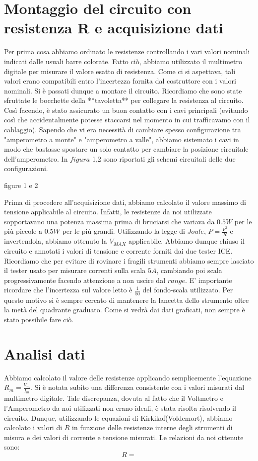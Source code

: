 \section{Montaggio del circuito con resistenza R e acquisizione dati}
Per prima cosa abbiamo ordinato le resistenze controllando i vari valori nominali indicati dalle usuali barre colorate.
Fatto ciò, abbiamo utilizzato il multimetro digitale per misurare il valore esatto di resistenza. Come ci si aspettava, tali valori erano compatibili entro l'incertezza fornita dal costruttore con i valori nominali.
Si è passati dunque a montare il circuito. Ricordiamo che sono state sfruttate le bocchette della **tavoletta** per collegare la resistenza al circuito. Così facendo, è stato assicurato un buon contatto con i cavi principali (evitando così che accidentalmente potesse staccarsi nel momento in cui trafficavamo con il cablaggio).
Sapendo che vi era necessità di cambiare spesso configurazione tra "amperometro a monte" e "amperometro a valle", abbiamo sistemato i cavi in modo che bastasse spostare un solo contatto per cambiare la posizione circuitale dell'amperometro. In $figura$ 1,2 sono riportati gli schemi circuitali delle due configurazioni.

\begin{center}{figure 1 e 2}
\end{center}

Prima di procedere all'acquisizione dati, abbiamo calcolato il valore massimo di tensione applicabile al circuito. Infatti, le resistenze da noi utilizzate sopportavano una potenza massima prima di bruciarsi che variava da $0.5W$ per le più piccole a $0.5W$ per le più grandi. Utilizzando la legge di $Joule$, $P=\frac{V^2}{R}$ e invertendola, abbiamo ottenuto la $V_{MAX}$ applicabile.
Abbiamo dunque chiuso il circuito e annotati i valori di tensione e corrente forniti dai due tester ICE. Ricordiamo che per evitare di rovinare i fragili strumenti abbiamo sempre lasciato il tester usato per misurare correnti sulla scala $5A$, cambiando poi scala progressivamente facendo attenzione a non uscire dal $range$. E' importante ricordare che l'incertezza sul valore letto è $\frac{1}{50}$ del fondo-scala utilizzato. Per questo motivo si è sempre cercato di mantenere la lancetta dello strumento oltre la metà del quadrante graduato. Come si vedrà dai dati graficati, non sempre è stato possibile fare ciò.

\section{Analisi dati}

Abbiamo calcolato il valore delle resistenze applicando semplicemente l'equazione $R_m=\frac{V_m}{I_m}$. Si è notata subito una differenza consistente con i valori misurati dal multimetro digitale. Tale discrepanza, dovuta al fatto che il Voltmetro e l'Amperometro da noi utilizzati non erano ideali, è stata risolta risolvendo il circuito. Dunque, utilizzando le equazioni di Kirkikof(Voldemort), abbiamo calcolato i valori di $R$ in funzione delle resistenze interne degli strumenti di misura e dei valori di corrente e tensione misurati. Le relazioni da noi ottenute sono:
\begin{equation}
R=
\end{equation} 